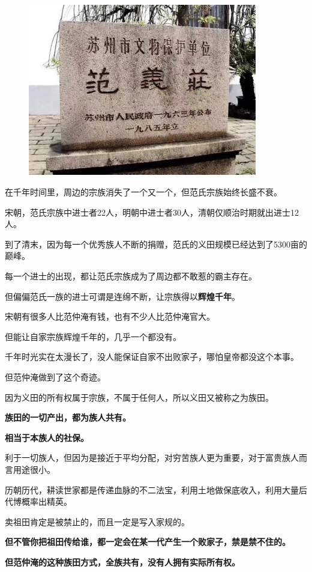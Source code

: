 \documentclass[UTF8, 11pt, oneside]{ctexart}
\newcommand{\zd}[1]{\textbf{\textcolor[RGB]{123,12,0}{#1}}} %
\begin{document}
\begin{figure}[H]
    \centering
    \includegraphics[width=10cm]{2024-03-20-001}
\end{figure}

在千年时间里，周边的宗族消失了一个又一个，但范氏宗族始终长盛不衰。

宋朝，范氏宗族中进士者22人，明朝中进士者30人，清朝仅顺治时期就出进士12人。

到了清末，因为每一个优秀族人不断的捐赠，范氏的义田规模已经达到了5300亩的巅峰。

每一个进士的出现，都让范氏宗族成为了周边都不敢惹的霸主存在。

但偏偏范氏一族的进士可谓是连绵不断，让宗族得以\zd{辉煌千年}。

宋朝有很多人比范仲淹有钱，也有不少人比范仲淹官大。

但能让自家宗族辉煌千年的，几乎一个都没有。

千年时光实在太漫长了，没人能保证自家不出败家子，哪怕皇帝都没这个本事。

但范仲淹做到了这个奇迹。

因为义田的所有权属于宗族，不属于任何人，所以义田又被称之为族田。

\zd{族田的一切产出，都为族人共有。}

\zd{相当于本族人的社保。}

利于一切族人，但因为是接近于平均分配，对穷苦族人更为重要，对于富贵族人而言用途很小。

历朝历代，耕读世家都是传递血脉的不二法宝，利用土地做保底收入，利用大量后代博概率出精英。

卖祖田肯定是被禁止的，而且一定是写入家规的。

\zd{但不管你把祖田传给谁，都一定会在某一代产生一个败家子，禁是禁不住的。}

\zd{但范仲淹的这种族田方式，全族共有，没有人拥有实际所有权。}
\end{document}
